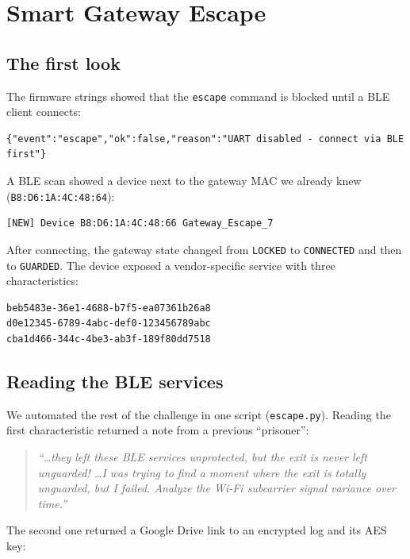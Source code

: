 \section{Smart Gateway Escape}\label{section:SmartGatewayEscape}

\subsection{The first look}
The firmware strings showed that the \texttt{escape} command is blocked until a BLE client connects:

\begin{lstlisting}
{"event":"escape","ok":false,"reason":"UART disabled - connect via BLE first"}
\end{lstlisting}

A BLE scan showed a device next to the gateway MAC we already knew (\texttt{B8:D6:1A:4C:48:64}):

\begin{lstlisting}
[NEW] Device B8:D6:1A:4C:48:66 Gateway_Escape_7
\end{lstlisting}

After connecting, the gateway state changed from \texttt{LOCKED} to \texttt{CONNECTED} and then to \texttt{GUARDED}. The device exposed a vendor-specific service with three characteristics:

\begin{lstlisting}[basicstyle=\ttfamily\scriptsize]
beb5483e-36e1-4688-b7f5-ea07361b26a8
d0e12345-6789-4abc-def0-123456789abc
cba1d466-344c-4be3-ab3f-189f80dd7518
\end{lstlisting}

\subsection{Reading the BLE services}
We automated the rest of the challenge in one script (\texttt{escape.py}). Reading the first characteristic returned a note from a previous ``prisoner'':

\begin{quote}\itshape
``\dots they left these BLE services unprotected, but the exit is never left unguarded! \dots I was trying to find a moment where the exit is totally unguarded, but I failed. Analyze the Wi-Fi subcarrier signal variance over time.''
\end{quote}

The second one returned a Google Drive link to an encrypted log and its AES key:

